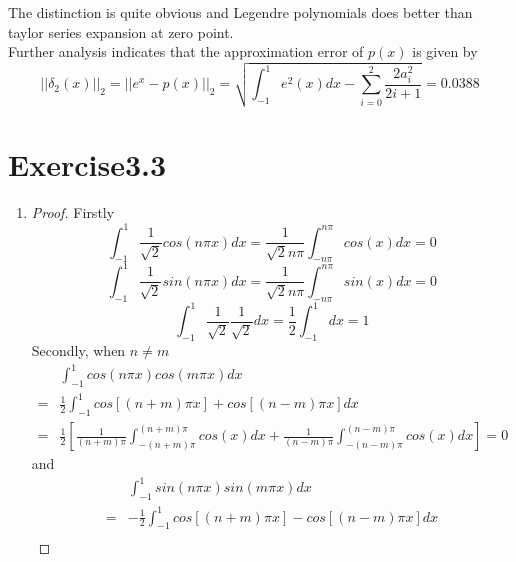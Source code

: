 \documentclass[paper=a4, fontsize=11pt]{scrartcl} %
\numberwithin{equation}{section} %
\numberwithin{figure}{section} %
\numberwithin{table}{section} %
\begin{document}
\begin{enumerate}
		The distinction is quite obvious and Legendre polynomials does better than taylor series expansion at zero point.\\
		Further analysis indicates that the approximation error of $p(x)$ is given by
		\begin{equation}
			||\delta_2(x)||_2 = ||e^x - p(x)||_2 = \sqrt{\int_{-1}^{1} e^2(x) dx - \sum_{i=0}^{2} \frac{2 a_i ^2}{2i + 1}} = 0.0388
		\end{equation}
	
	\end{enumerate}

\section{Exercise3.3}
	\begin{enumerate}
		\item 
			\begin{proof}
				Firstly
				\begin{equation}
					\int_{-1}^{1} \frac{1}{\sqrt{2}} cos(n \pi x) dx = \frac{1}{\sqrt{2} n \pi} \int_{-n\pi}^{n \pi} cos(x) dx = 0
				\end{equation}
				\begin{equation}
					\int_{-1}^{1} \frac{1}{\sqrt{2}} sin(n \pi x) dx = \frac{1}{\sqrt{2} n \pi} \int_{-n\pi}^{n \pi} sin(x) dx = 0
				\end{equation}
				\begin{equation}
					\int_{-1}^{1} \frac{1}{\sqrt{2}} \frac{1}{\sqrt{2}} dx = \frac{1}{2} \int_{-1}^{1} dx = 1
				\end{equation}
				Secondly, when $n \neq m$
				\begin{equation}
					\begin{aligned}
						& \int_{-1}^{1} cos(n \pi x) cos(m \pi x) dx\\
					  = & \frac{1}{2} \int_{-1}^{1} cos[(n+m) \pi x] + cos[(n-m) \pi x] dx\\
					  = & \frac{1}{2} [\frac{1}{(n+m)\pi} \int_{-(n+m)\pi}^{(n+m)\pi} cos(x) dx + \frac{1}{(n-m)\pi} \int_{-(n-m)\pi}^{(n-m)\pi} cos(x) dx] = 0
					\end{aligned}
				\end{equation}
				and
				\begin{equation}
					\begin{aligned}
						& \int_{-1}^{1} sin(n \pi x) sin(m \pi x) dx\\
					  = & - \frac{1}{2} \int_{-1}^{1} cos[(n+m) \pi x] - cos[(n-m) \pi x] dx\\

\end{aligned}
\end{equation}
\end{proof}
\end{enumerate}
\end{document}
